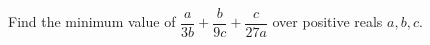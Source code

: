 Find the minimum value of $\dfrac{a}{3b}+\dfrac{b}{9c}+\dfrac{c}{27a}$ over positive reals $a,b,c$.
